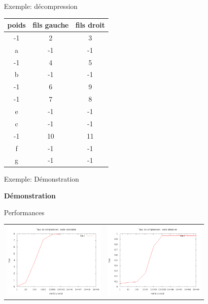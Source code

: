 \documentclass[french]{beamer}
\begin{document}
\begin{frame}{Exemple: décompression}
	\begin{tabular}{|c|c|c|}
	\hline
	poids & fils gauche & fils droit \\
	\hline -1 & 2 & 3 \\
	\hline a & -1 & -1\\
	\hline -1 & 4 & 5 \\
	\hline b & -1 & -1 \\
	\hline -1 & 6 & 9 \\
	\hline -1 & 7 & 8 \\
	\hline e & -1 & -1 \\
	\hline c & -1 & -1 \\
	\hline -1 & 10 & 11 \\
	\hline f & -1 & -1\\
	\hline g & -1 & -1\\
	\hline
	\end{tabular}
\end{frame}
\begin{frame}{Exemple: Démonstration}
	\begin{center}
	\textbf{Démonstration}
	\end{center}
\end{frame}

\begin{frame}{Performances}
	\begin{center}
	\begin{tabular}{l | l}
	\includegraphics[width=5cm]{HConstant.png} & 
	\includegraphics[width=5cm]{aleaH.png}
	\end{tabular}
	\end{center}
\end{frame}
\end{document}
